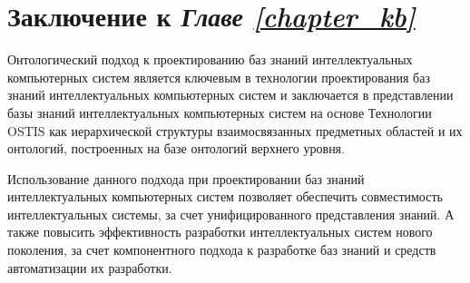 \section*{Заключение к \textit{Главе \ref{chapter_kb}~}}

Онтологический подход к проектированию баз знаний интеллектуальных компьютерных систем является ключевым в технологии проектирования баз знаний интеллектуальных компьютерных систем и заключается в представлении базы знаний интеллектуальных компьютерных систем на основе Технологии OSTIS как иерархической структуры взаимосвязанных предметных областей и их онтологий, построенных на базе онтологий верхнего уровня.

Использование данного подхода при проектировании баз знаний интеллектуальных компьютерных систем позволяет обеспечить совместимость интеллектуальных системы, за счет унифицированного представления знаний. А также повысить эффективность разработки интеллектуальных систем нового поколения, за счет компонентного подхода к разработке баз знаний и средств автоматизации их разработки.

%